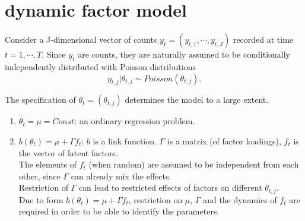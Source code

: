 \section{dynamic factor model}
Consider a J-dimensional vector of counts $ y_t=(y_{t,1},\cdots,y_{t,J}) $  recorded at time $ t=1,\cdots,T $. Since $ y_t $ are counts, they are naturally assumed to be conditionally independently distributed with Poisson distributions $$ y_{t,j}|\theta_{t,j} \sim Poisson(\theta_{t,j}). $$

The specification of $ \theta_t=(\theta_{t,j}) $ determines the model to a large extent.
\begin{enumerate}
\item $ \theta_t=\mu=Const $: an ordinary regression problem.
\item $ b(\theta_t)=\mu+\Gamma f_t $: $ b $ is a link function. $ \Gamma $ is a matrix (of factor loadings), $ f_t $ is the vector of latent factors. 
\\The elements of $ f_t $ (when random) are assumed to be independent from each other, since $ \Gamma $ can already mix the effects.
\\Restriction of $ \Gamma $ can lead to restricted effects of factors on different $ \theta_{t,j} $.
\\Due to form  $ b(\theta_t)=\mu+\Gamma f_t $, restriction on $ \mu $, $ \Gamma $ and the dynamics of $ f_t $ are required in order to be able to identify the parameters.
\end{enumerate}
